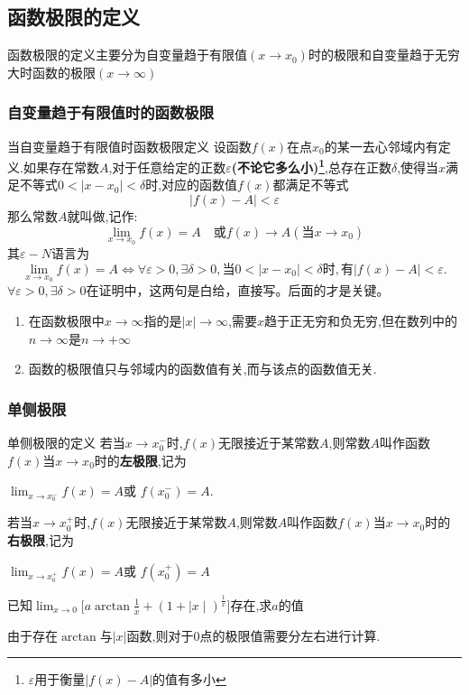 \documentclass[12pt, a4paper, oneside, UTF8]{ctexbook}
\begin{document}
\begin{sloppypar}
    \subsection{函数极限的定义}
    函数极限的定义主要分为自变量趋于有限值$(x \to x_0)$时的极限和自变量趋于无穷大时函数的极限$(x \to \infty)$
    \subsubsection{自变量趋于有限值时的函数极限}
    \begin{defn}{当自变量趋于有限值时函数极限定义}{}
        设函数$f(x)$在点$x_0$的某一去心邻域内有定义.如果存在常数$A$,对于任意给定的正数$\varepsilon$\textbf{(不论它多么小)\footnote{$\varepsilon$用于衡量$|f(x)-A|$的值有多小}},总存在正数$\delta$,使得当$x$满足不等式$0<|x-x_0|<\delta$时,对应的函数值$f(x)$都满足不等式
        $$
            |f(x)-A|<\varepsilon
        $$
        那么常数$A$就叫做,记作:
        $$
            \lim_{x\to x_0}f(x)=A\quad\text{或}f(x)\to A(\text{当}x\to x_0)
        $$
        其$\varepsilon-N$语言为
        $$
            \lim_{x\to x_0}f(x)=A\Leftrightarrow\forall\varepsilon>0,\exists\delta>0,\text{当}0<|x-x_0|<\delta\text{时},\text{有}|f(x)-A|<\varepsilon.
        $$
        $\forall\varepsilon>0,\exists\delta>0$在证明中，这两句是白给，直接写。后面的才是关键。
    \end{defn}
    \begin{criterion}{}{}
        \begin{enumerate}
            \item 在函数极限中$x \to \infty$指的是$|x| \to \infty$,需要$x$趋于正无穷和负无穷,但在数列中的$n \to \infty$是$n \to +\infty$
            \item 函数的极限值只与邻域内的函数值有关,而与该点的函数值无关.
        \end{enumerate}
    \end{criterion}
    \subsubsection{单侧极限}
    \begin{defn}{单侧极限的定义}{}
        若当$x\to x_0^{-}$时,$f(x)$无限接近于某常数$A$,则常数$A$叫作函数$f(x)$当$x\to x_0$时的\textbf{左极限},记为
        \begin{center}
            $\operatorname*{lim}_{x\to x_0^{-}}f(x)=A$或 $f(x_0^{-})=A$.
        \end{center}
        若当$x\to x_0^+$时,$f(x)$无限接近于某常数$A$,则常数$A$叫作函数$f(x)$当$x\to x_0$时的\textbf{右极限},记为
        \begin{center}
            $\operatorname*{lim}_{x\to x_0^{+}}f(x)=A$或 $f(x_0^{+})=A$
        \end{center}
    \end{defn}
    \begin{problem}
    $\text{已知}\lim_{x\to0}\biggl[a\arctan\frac{1}{x}+(1+\mid x\mid)^{\frac{1}{x}}\biggr]\text{存在,求}a\text{的值}$
    \end{problem}
    \begin{solution}
        由于存在$\arctan$与$|x|$函数,则对于0点的极限值需要分左右进行计算.


\end{solution}
\end{sloppypar}
\end{document}
